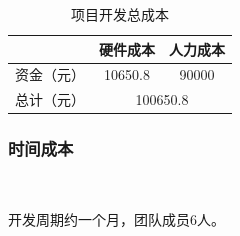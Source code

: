 \begin{table}[H]
  \centering
  \caption{项目开发总成本}
    \begin{tabular}{|p{5em}|cc|}
    \hline
    \multicolumn{1}{|r|}{\textcolor[rgb]{ .298,  .282,  .239}{}} & \multicolumn{1}{p{4.055em}|}{\textcolor[rgb]{ .298,  .282,  .239}{硬件成本}} & \multicolumn{1}{p{4.055em}|}{\textcolor[rgb]{ .298,  .282,  .239}{人力成本}} \\
    \hline
    \textcolor[rgb]{ .298,  .282,  .239}{资金（元）} & \multicolumn{1}{c|}{\textcolor[rgb]{ .298,  .282,  .239}{10650.8}} & \textcolor[rgb]{ .298,  .282,  .239}{90000} \\
    \hline
    \textcolor[rgb]{ .298,  .282,  .239}{总计（元）} & \multicolumn{2}{c|}{\textcolor[rgb]{ .298,  .282,  .239}{100650.8}} \\
    \hline
    \end{tabular}%
  \label{tab:kfzcb}%
\end{table}%


\subsubsection{时间成本}\

开发周期约一个月，团队成员6人。







